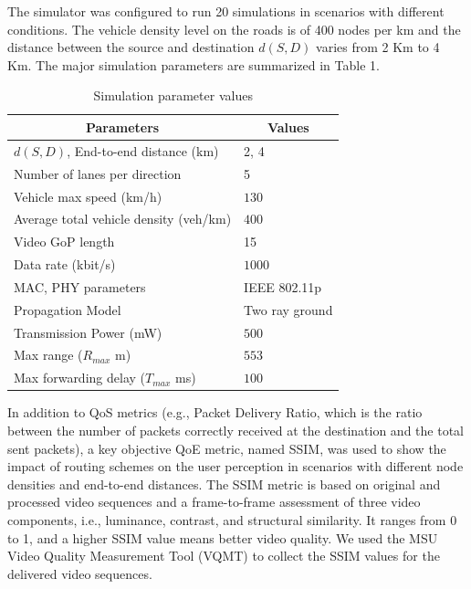 \documentclass{sig-alternate-2013}
\begin{document}
The simulator was configured to run 20 simulations in scenarios with different conditions. The vehicle density level on the roads is of 400 nodes per km and the distance between the source and destination $d(S,D)$ varies from 2 Km to 4 Km. The major simulation parameters are summarized in Table 1.
\begin{table}[b]
	\label{tab:parameters}
	\begin{center}
	\begin{tabular}{l|l}
	\hline
	\multicolumn{1}{c|}{\textbf{Parameters}} &
	\multicolumn{1}{c}{\textbf{Values}} \\
	\hline
	$d(S,D)$, End-to-end distance (km) & 2, 4 \\
	Number of lanes per direction & 5 \\
	Vehicle max speed (km/h) & $130$\\
	Average total vehicle density (veh/km) & $400$ \\
	Video GoP length &  15\\
	Data rate (kbit/s) & $1000$  \\
	MAC, PHY parameters & IEEE 802.11p \\
	Propagation Model & Two ray ground \\
	Transmission Power (mW) & $500$ \\
	Max range ($R_{max}$ m) & $553$\\
	Max forwarding delay ($T_{max}$ ms) & $100$\\
	\hline
	\end{tabular}
	\caption{Simulation parameter values}
	\end{center}
	\label{tab:parameters}
\end{table}

In addition to QoS metrics (e.g., Packet Delivery Ratio, which is the ratio between the number of packets correctly received at the destination and the total sent packets), a key objective QoE metric, named SSIM, was used to show the impact of routing schemes on the user perception in scenarios with different node densities and end-to-end distances. The SSIM metric is based on original and processed video sequences and a frame-to-frame assessment of three video components, i.e., luminance, contrast, and structural similarity. It ranges from 0 to 1, and a higher SSIM value means better video quality. We used the MSU Video Quality Measurement Tool (VQMT)  to collect the SSIM values for the delivered video sequences.
\end{document}

